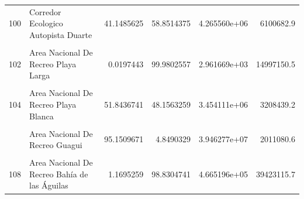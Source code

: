 \documentclass[10pt,landscape,a3paper]{article}
\begin{document}
\begin{longtable}[t]{llrrrr}
100 & Corredor Ecologico Autopista Duarte & 41.1485625 & 58.8514375 & 4.265560e+06 & 6100682.9\\
\addlinespace
\cellcolor{lightgray}{101} & \cellcolor{lightgray}{Corredor Ecologico Autopista 6 de Noviembre} & \cellcolor{lightgray}{20.5983424} & \cellcolor{lightgray}{79.4016576} & \cellcolor{lightgray}{7.483224e+05} & \cellcolor{lightgray}{2884602.8}\\
102 & Area Nacional De Recreo Playa Larga & 0.0197443 & 99.9802557 & 2.961669e+03 & 14997150.5\\
\cellcolor{lightgray}{103} & \cellcolor{lightgray}{Area Nacional De Recreo Playa de Cabo Rojo - Pedernales} & \cellcolor{lightgray}{6.7464316} & \cellcolor{lightgray}{93.2535684} & \cellcolor{lightgray}{1.181795e+06} & \cellcolor{lightgray}{16335533.9}\\
104 & Area Nacional De Recreo Playa Blanca & 51.8436741 & 48.1563259 & 3.454111e+06 & 3208439.2\\
\cellcolor{lightgray}{105} & \cellcolor{lightgray}{Area Nacional De Recreo Guaraguao - Punta Catuano} & \cellcolor{lightgray}{67.2725113} & \cellcolor{lightgray}{32.7274887} & \cellcolor{lightgray}{1.250931e+07} & \cellcolor{lightgray}{6085669.8}\\
\addlinespace
106 & Area Nacional De Recreo Guagui & 95.1509671 & 4.8490329 & 3.946277e+07 & 2011080.6\\
\cellcolor{lightgray}{107} & \cellcolor{lightgray}{Area Nacional De Recreo Boca de Nigua} & \cellcolor{lightgray}{15.0601647} & \cellcolor{lightgray}{84.9398353} & \cellcolor{lightgray}{8.757018e+05} & \cellcolor{lightgray}{4938987.4}\\
108 & Area Nacional De Recreo Bahía de las Águilas & 1.1695259 & 98.8304741 & 4.665196e+05 & 39423115.7\\*
\end{longtable}
\end{document}
